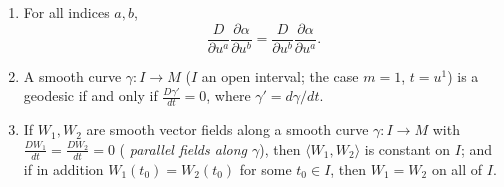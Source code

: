 \begin{lemma}
\begin{enumerate}
$$\frac{\partial}{\partial u^a}\langle W_1,W_2\rangle
=\left\langle\frac{DW_1}{\partial u^a},W_2\right\rangle
+\left\langle W_1,\frac{DW_2}{\partial u^a}\right\rangle .$$
\item For all indices $a,b$,
$$\frac{D}{\partial u^a}\frac{\partial\alpha}{\partial u^b}
=\frac{D}{\partial u^b}\frac{\partial\alpha}{\partial u^a}.$$
\item A smooth curve $\gamma\colon I\to M$ ($I$ an open interval; the
case $m=1$, $t=u^1$) is a geodesic if and only if
$\frac{D\gamma'}{dt}=0$, where $\gamma'=d\gamma/dt$.
\item If $W_1,W_2$ are smooth vector fields along a smooth curve
$\gamma\colon I\to M$ with $\frac{DW_1}{dt}=\frac{DW_2}{dt}=0$ ({\em
parallel fields along $\gamma$}), then $\langle W_1,W_2\rangle$ is
constant on $I$; and if in addition $W_1(t_0)=W_2(t_0)$ for some
$t_0\in I$, then $W_1=W_2$ on all of $I$.
\end{enumerate}
\end{lemma}

